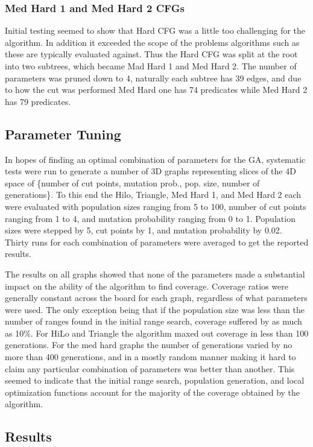 \documentclass[runningheads]{llncs}
\begin{document}
\subsubsection{Med Hard 1 and Med Hard 2 CFGs}
Initial testing seemed to show that Hard CFG was a little too challenging for the algorithm. In addition it exceeded the scope of the problems algorithms such as these are typically evaluated against. Thus the Hard CFG was split at the root into two subtrees, which became Mad Hard 1 and Med Hard 2. The number of parameters was pruned down to 4, naturally each subtree has 39 edges, and due to how the cut was performed Med Hard one has 74 predicates while Med Hard 2 has 79 predicates.



\subsection{Parameter Tuning} 
In hopes of finding an optimal combination of parameters for the GA, systematic tests were run to generate a number of 3D graphs representing slices of the 4D space of \{number of cut points, mutation prob., pop. size, number of generations\}. To this end the Hilo, Triangle, Med Hard 1, and Med Hard 2 each were evaluated with population sizes ranging from 5 to 100, number of cut points ranging from 1 to 4, and mutation probability ranging from 0 to 1. Population sizes were stepped by 5, cut points by 1, and mutation probability by 0.02. Thirty runs for each combination of parameters were averaged to get the reported results. 

The results on all graphs showed that none of the parameters made a substantial impact on the ability of the algorithm to find coverage. Coverage ratios were generally constant across the board for each graph, regardless of what parameters were used. The only exception being that if the population size was less than the number of ranges found in the initial range search, coverage suffered by as much as 10\%. For HiLo and Triangle the algorithm maxed out coverage in less than 100 generations. For the med hard graphs the number of generations varied by no more than 400 generations, and in a mostly random manner making it hard to claim any particular combination of parameters was better than another. This seemed to indicate that the initial range search, population generation, and local optimization functions account for the majority of the coverage obtained by the algorithm.

\subsection{Results}
\end{document}
